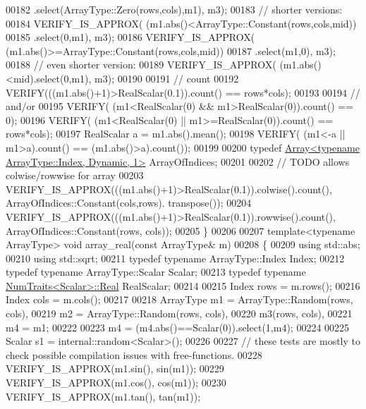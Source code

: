 \begin{DoxyCode}
00182                         .select(ArrayType::Zero(rows,cols),m1), m3);
00183   \textcolor{comment}{// shorter versions:}
00184   VERIFY\_IS\_APPROX( (m1.abs()<ArrayType::Constant(rows,cols,mid))
00185                         .select(0,m1), m3);
00186   VERIFY\_IS\_APPROX( (m1.abs()>=ArrayType::Constant(rows,cols,mid))
00187                         .select(m1,0), m3);
00188   \textcolor{comment}{// even shorter version:}
00189   VERIFY\_IS\_APPROX( (m1.abs()<mid).select(0,m1), m3);
00190 
00191   \textcolor{comment}{// count}
00192   VERIFY(((m1.abs()+1)>RealScalar(0.1)).count() == rows*cols);
00193 
00194   \textcolor{comment}{// and/or}
00195   VERIFY( (m1<RealScalar(0) && m1>RealScalar(0)).count() == 0);
00196   VERIFY( (m1<RealScalar(0) || m1>=RealScalar(0)).count() == rows*cols);
00197   RealScalar a = m1.abs().mean();
00198   VERIFY( (m1<-a || m1>a).count() == (m1.abs()>a).count());
00199 
00200   \textcolor{keyword}{typedef} \hyperlink{group___core___module_class_eigen_1_1_array}{Array<typename ArrayType::Index, Dynamic, 1>} 
      ArrayOfIndices;
00201 
00202   \textcolor{comment}{// TODO allows colwise/rowwise for array}
00203   VERIFY\_IS\_APPROX(((m1.abs()+1)>RealScalar(0.1)).colwise().count(), ArrayOfIndices::Constant(cols,rows).
      transpose());
00204   VERIFY\_IS\_APPROX(((m1.abs()+1)>RealScalar(0.1)).rowwise().count(), ArrayOfIndices::Constant(rows, cols));
00205 \}
00206 
00207 \textcolor{keyword}{template}<\textcolor{keyword}{typename} ArrayType> \textcolor{keywordtype}{void} array\_real(\textcolor{keyword}{const} ArrayType& m)
00208 \{
00209   \textcolor{keyword}{using} std::abs;
00210   \textcolor{keyword}{using} std::sqrt;
00211   \textcolor{keyword}{typedef} \textcolor{keyword}{typename} ArrayType::Index Index;
00212   \textcolor{keyword}{typedef} \textcolor{keyword}{typename} ArrayType::Scalar Scalar;
00213   \textcolor{keyword}{typedef} \textcolor{keyword}{typename} \hyperlink{group___core___module_struct_eigen_1_1_num_traits}{NumTraits<Scalar>::Real} RealScalar;
00214 
00215   Index rows = m.rows();
00216   Index cols = m.cols();
00217 
00218   ArrayType m1 = ArrayType::Random(rows, cols),
00219             m2 = ArrayType::Random(rows, cols),
00220             m3(rows, cols),
00221             m4 = m1;
00222 
00223   m4 = (m4.abs()==Scalar(0)).select(1,m4);
00224 
00225   Scalar  s1 = internal::random<Scalar>();
00226 
00227   \textcolor{comment}{// these tests are mostly to check possible compilation issues with free-functions.}
00228   VERIFY\_IS\_APPROX(m1.sin(), sin(m1));
00229   VERIFY\_IS\_APPROX(m1.cos(), cos(m1));
00230   VERIFY\_IS\_APPROX(m1.tan(), tan(m1));

\end{DoxyCode}
